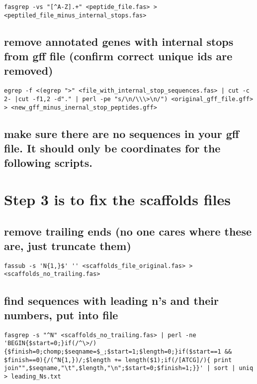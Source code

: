 \documentclass[11pt]{article}
\begin{document}
\begin{verbatim}
fasgrep -vs "[^A-Z].+" <peptide_file.fas> > <peptiled_file_minus_internal_stops.fas>
\end{verbatim}


\subsection*{remove annotated genes with internal stops from gff file (confirm correct unique ids are removed)}
\label{sec-2.3}


\begin{verbatim}
egrep -f <(egrep ">" <file_with_internal_stop_sequences.fas> | cut -c 2- |cut -f1,2 -d"." | perl -pe "s/\n/\\\>\n/") <original_gff_file.gff> > <new_gff_minus_inernal_stop_peptides.gff>
\end{verbatim}


\subsection*{make sure there are no sequences in your gff file. It should only be coordinates for the following scripts.}
\label{sec-2.4}

\section*{Step 3 is to fix the scaffolds files}
\label{sec-3}

\subsection*{remove trailing ends (no one cares where these are, just truncate them)}
\label{sec-3.1}


\begin{verbatim}
fassub -s 'N{1,}$' '' <scaffolds_file_original.fas> > <scaffolds_no_trailing.fas>
\end{verbatim}


\subsection*{find sequences with leading n's and their numbers, put into file}
\label{sec-3.2}


\begin{verbatim}
fasgrep -s "^N" <scaffolds_no_trailing.fas> | perl -ne 'BEGIN{$start=0;}if(/^\>/){$finish=0;chomp;$seqname=$_;$start=1;$length=0;}if($start==1 && $finish==0){/(^N{1,})/;$length += length($1);if(/[ATCG]/){ print join"",$seqname,"\t",$length,"\n";$start=0;$finish=1;}}' | sort | uniq > leading_Ns.txt
\end{verbatim}
\end{document}
